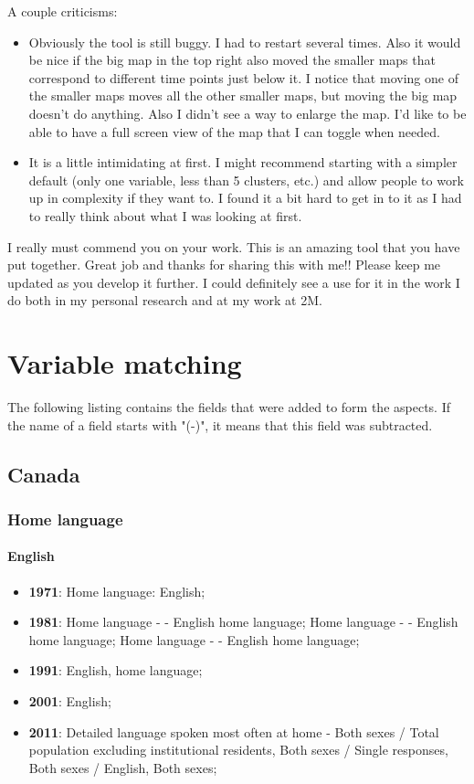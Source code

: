 \documentclass[a4paper]{article}
\begin{document}
A couple criticisms:

\begin{itemize}
  
  \item{Obviously the tool is still buggy. I had to restart several times. Also
  it would be nice if the big map in the top right also moved the smaller maps
  that correspond to different time points just below it. I notice that moving
  one of the smaller maps moves all the other smaller maps, but moving the big
  map doesn’t do anything. Also I didn’t see a way to enlarge the map. I’d like
  to be able to have a full screen view of the map that I can toggle when
  needed.}
  
  \item{It is a little intimidating at first. I might recommend starting with a
  simpler default (only one variable, less than 5 clusters, etc.) and allow
  people to work up in complexity if they want to. I found it a bit hard to get
  in to it as I had to really think about what I was looking at first.}
\end{itemize}

I really must commend you on your work. This is an amazing tool that you have
put together. Great job and thanks for sharing this with me!! Please keep me
updated as you develop it further. I could definitely see a use for it in the
work I do both in my personal research and at my work at 2M.




\clearpage
\section{Variable matching} 

The following listing contains the fields that were added to form the aspects.
If the name of a field starts with "(-)", it means that this field was
subtracted.


\subsection{Canada}
\subsubsection{Home language}
\paragraph{English}
\begin{itemize}
   \item{\textbf{1971}:  Home language: English;}
   \item{\textbf{1981}:  Home language - - English home language; Home language - - English home language; Home language - - English home language;}
   \item{\textbf{1991}:  English, home language;}
   \item{\textbf{2001}:  English;}
   \item{\textbf{2011}:  Detailed language spoken most often at home - Both sexes / Total population excluding institutional residents, Both sexes / Single responses, Both sexes / English, Both sexes;}
\end{itemize}
\end{document}
